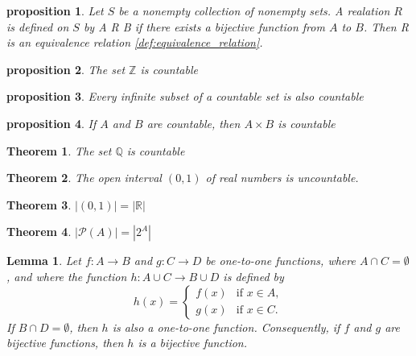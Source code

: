 \documentclass{article}
\newtheorem{theorem}{Theorem}[section]
\newtheorem{lemma}{Lemma}[section]
\newtheorem{proposition}{Proposition}[section]
\newtheorem{proposition}{proposition}[section]
\theoremstyle{definition}
\theoremstyle{remark}
\begin{document}
\begin{proposition}
Let $S$ be a nonempty collection of nonempty sets. A realation $R$ is defined on $S$ by A R B if there exists a bijective function from $A$ to $B$. Then R is an equivalence relation \ref{def:equivalence_relation}.
\end{proposition}


\begin{proposition}
The set $\mathbb{Z}$ is countable
\end{proposition}


\begin{proposition}
Every infinite subset of a countable set is also countable
\end{proposition}


\begin{proposition}
If $A$ and $B$ are countable, then $A \times B$ is countable
\end{proposition}





\begin{theorem}
The set $\mathbb{Q}$ is countable
\end{theorem}


\begin{theorem}
The open interval $(0,1)$ of real numbers is uncountable.
\end{theorem}

\begin{theorem}
\( |(0,1)| = |\mathbb{R}| \)
\end{theorem}




\begin{theorem}
\( |\mathcal{P}(A)| = |2^A| \)
\end{theorem}




\begin{lemma}

Let \( f: A \to B \) and \( g: C \to D \) be one-to-one functions, where \( A \cap C = \emptyset \), and where the function \( h: A \cup C \to B \cup D \) is defined by
\[
h(x) =
\begin{cases} 
f(x) & \text{if } x \in A, \\
g(x) & \text{if } x \in C.
\end{cases}
\]
If \( B \cap D = \emptyset \), then \( h \) is also a one-to-one function. Consequently, if \( f \) and \( g \) are bijective functions, then \( h \) is a bijective function.
\end{lemma}
\end{document}
